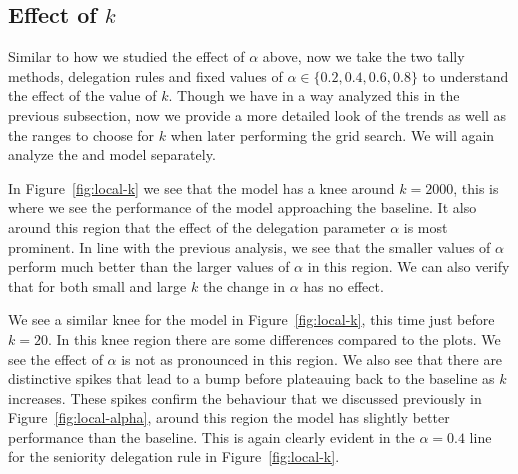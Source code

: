 \subsection{Effect of $k$}
Similar to how we studied the effect of $\alpha$ above, now we take the two tally methods, delegation rules and fixed values of $\alpha \in \{0.2,0.4,0.6,0.8\}$ to understand the effect of the value of $k$. Though we have in a way analyzed this in the previous subsection, now we provide a more detailed look of the trends as well as the ranges to choose for $k$ when later performing the grid search. We will again analyze the \globalv and \localv model separately.

In Figure~\ref{fig:local-k} we see that the \globalv model has a knee around $k=2000$, this is where we see the performance of the model approaching the baseline. It also around this region that the effect of the delegation parameter $\alpha$ is most prominent. In line with the previous analysis, we see that the smaller values of $\alpha$ perform much better than the larger values of $\alpha$ in this region. We can also verify that for both small and large $k$ the change in $\alpha$ has no effect.

We see a similar knee for the \localv model in Figure~\ref{fig:local-k}, this time just before $k=20$. In this knee region there are some differences compared to the \globalv plots. We see the effect of $\alpha$ is not as pronounced in this region. We also see that there are distinctive spikes that lead to a bump before plateauing back to the baseline as $k$ increases. These spikes confirm the behaviour that we discussed previously in Figure~\ref{fig:local-alpha}, around this region the \localv model has slightly better performance than the baseline. This is again clearly evident in the $\alpha=0.4$ line for the seniority delegation rule in Figure~\ref{fig:local-k}.

